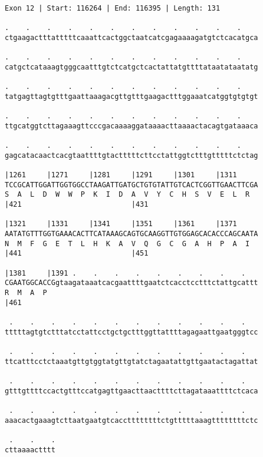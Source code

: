 \documentclass{article}
\begin{document}
\begin{Verbatim}
Exon 12 | Start: 116264 | End: 116395 | Length: 131
 
.    .    .    .    .    .    .    .    .    .    .    .    
ctgaagactttatttttcaaattcactggctaatcatcgagaaaagatgtctcacatgca
  
.    .    .    .    .    .    .    .    .    .    .    .    
catgctcataaagtgggcaatttgtctcatgctcactattatgttttataatataatatg
  
.    .    .    .    .    .    .    .    .    .    .    .    
tatgagttagtgtttgaattaaagacgttgtttgaagactttggaaatcatggtgtgtgt
  
.    .    .    .    .    .    .    .    .    .    .    .    
ttgcatggtcttagaaagttcccgacaaaaggataaaacttaaaactacagtgataaaca
  
.    .    .    .    .    .    .    .    .    .    .    .    
gagcatacaactcacgtaattttgtactttttcttcctattggtctttgtttttctctag
  
|1261     |1271     |1281     |1291     |1301     |1311     
TCCGCATTGGATTGGTGGCCTAAGATTGATGCTGTGTATTGTCACTCGGTTGAACTTCGA
S  A  L  D  W  W  P  K  I  D  A  V  Y  C  H  S  V  E  L  R  
|421                          |431                          
  
|1321     |1331     |1341     |1351     |1361     |1371     
AATATGTTTGGTGAAACACTTCATAAAGCAGTGCAAGGTTGTGGAGCACACCCAGCAATA
N  M  F  G  E  T  L  H  K  A  V  Q  G  C  G  A  H  P  A  I  
|441                          |451                          
  
|1381     |1391 .    .    .    .    .    .    .    .    .   
CGAATGGCACCGgtaagataaatcacgaattttgaatctcacctcctttctattgcattt
R  M  A  P                                                  
|461                                                        
  
 .    .    .    .    .    .    .    .    .    .    .    .   
tttttagtgtctttatcctattcctgctgctttggttattttagagaattgaatgggtcc
  
 .    .    .    .    .    .    .    .    .    .    .    .   
ttcatttcctctaaatgttgtggtatgttgtatctagaatattgttgaatactagattat
  
 .    .    .    .    .    .    .    .    .    .    .    .   
gtttgttttccactgtttccatgagttgaacttaacttttcttagataaattttctcaca
  
 .    .    .    .    .    .    .    .    .    .    .    .   
aaacactgaaagtcttaatgaatgtcaccttttttttctgtttttaaagttttttttctc
  
 .    .    .
cttaaaactttt
\end{Verbatim}
\newpage
\end{document}
